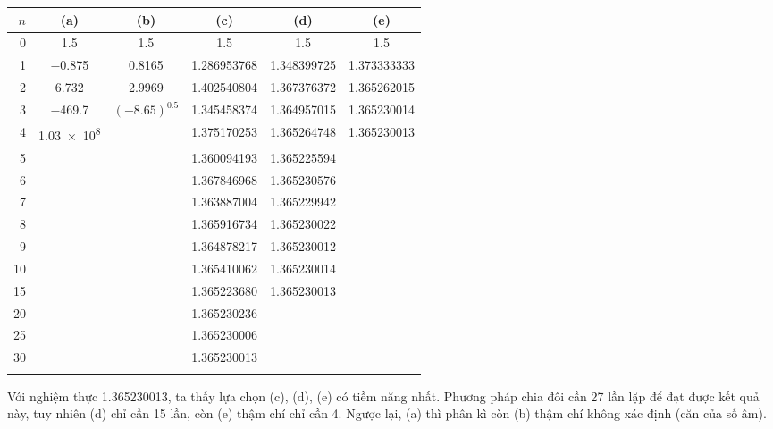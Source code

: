 \documentclass[../../Lectures.tex]{subfiles}
\begin{document}
\begin{exmp}
    \begin{tabular}{r c c S[table-format=1.9] S[table-format=1.9] S[table-format=1.9]}
        \\
        \toprule
        {\(n\)}  & {(a)}          & {(b)}                     & {(c)}         & {(d)}         & {(e)}         \\
          &  \num{1.5}     &  \num{1.5}                &  1.5          &  1.5          &  1.5          \\
              1  &  \num{-0.875}  &  \num{0.8165}             &  1.286953768  &  1.348399725  &  1.373333333  \\
              2  &  \num{6.732}   &  \num{2.9969}             &  1.402540804  &  1.367376372  &  1.365262015  \\
              3  &  \num{-469.7}  &  \((\num{-8.65})^{0.5}\)  &  1.345458374  &  1.364957015  &  1.365230014  \\
              4  &  \num{1.03e8}  &                           &  1.375170253  &  1.365264748  &  1.365230013  \\
              5  &                &                           &  1.360094193  &  1.365225594  &               \\
              6  &                &                           &  1.367846968  &  1.365230576  &               \\
              7  &                &                           &  1.363887004  &  1.365229942  &               \\
              8  &                &                           &  1.365916734  &  1.365230022  &               \\
              9  &                &                           &  1.364878217  &  1.365230012  &               \\
             10  &                &                           &  1.365410062  &  1.365230014  &               \\
             15  &                &                           &  1.365223680  &  1.365230013  &               \\
             20  &                &                           &  1.365230236  &               &               \\
             25  &                &                           &  1.365230006  &               &               \\
             30  &                &                           &  1.365230013  &               &               \\
        \bottomrule
        \\
    \end{tabular}

    Với nghiệm thực \num{1.365230013}, ta thấy lựa chọn (c), (d), (e) có tiềm
    năng nhất. Phương pháp chia đôi cần 27 lần lặp để đạt được kết quả này, tuy
    nhiên (d) chỉ cần 15 lần, còn (e) thậm chí chỉ cần 4. Ngược lại, (a) thì
    phân kì còn (b) thậm chí không xác định (căn của số âm).
\end{exmp}
\end{document}
